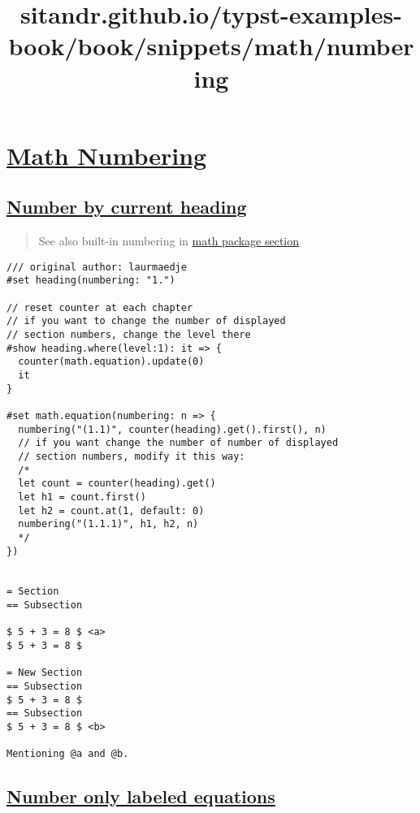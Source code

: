 \title{sitandr.github.io/typst-examples-book/book/snippets/math/numbering}

\section{\texorpdfstring{\hyperref[math-numbering]{Math
Numbering}}{Math Numbering}}\label{math-numbering}

\subsection{\texorpdfstring{\hyperref[number-by-current-heading]{Number
by current
heading}}{Number by current heading}}\label{number-by-current-heading}

\begin{quote}
See also built-in numbering in
\href{../../packages/math.html\#theorems}{math package section}
\end{quote}

\begin{verbatim}
/// original author: laurmaedje
#set heading(numbering: "1.")

// reset counter at each chapter
// if you want to change the number of displayed 
// section numbers, change the level there
#show heading.where(level:1): it => {
  counter(math.equation).update(0)
  it
}

#set math.equation(numbering: n => {
  numbering("(1.1)", counter(heading).get().first(), n)
  // if you want change the number of number of displayed
  // section numbers, modify it this way:
  /*
  let count = counter(heading).get()
  let h1 = count.first()
  let h2 = count.at(1, default: 0)
  numbering("(1.1.1)", h1, h2, n)
  */
})


= Section
== Subsection

$ 5 + 3 = 8 $ <a>
$ 5 + 3 = 8 $

= New Section
== Subsection
$ 5 + 3 = 8 $
== Subsection
$ 5 + 3 = 8 $ <b>

Mentioning @a and @b.
\end{verbatim}

\pandocbounded{}

\subsection{\texorpdfstring{\hyperref[number-only-labeled-equations]{Number
only labeled
equations}}{Number only labeled equations}}\label{number-only-labeled-equations}

